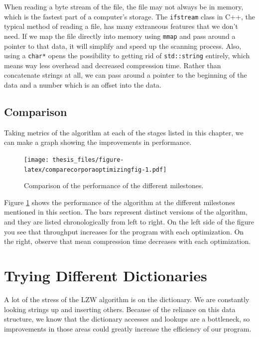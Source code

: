 \documentclass[12pt,twoside]{reedthesis}
\begin{document}
When reading a byte stream of the file, the file may not always be in memory, which is the fastest part of a computer's storage. The \texttt{ifstream} class in C++, the typical method of reading a file, has many extraneous features that we don't need. If we map the file directly into memory using \texttt{mmap} and pass around a pointer to that data, it will simplify and speed up the scanning process. Also, using a \texttt{char*} opens the possibility to getting rid of \texttt{std::string} entirely, which means way less overhead and decreased compression time. Rather than concatenate strings at all, we can pass around a pointer to the beginning of the data and a number which is an offset into the data.

\hypertarget{comparison}{%
\subsection{Comparison}\label{comparison}}

Taking metrics of the algorithm at each of the stages listed in this chapter, we can make a graph showing the improvements in performance.
\begin{figure}
\centering
\texttt{[image: thesis\_files/figure-latex/comparecorporaoptimizingfig-1.pdf]}
\caption{\label{fig:comparecorporaoptimizingfig}Comparison of the performance of the different milestones.}
\end{figure}
Figure \ref{fig:comparecorporaoptimizingfig} shows the performance of the algorithm at the different milestones mentioned in this section. The bars represent distinct versions of the algorithm, and they are listed chronologically from left to right. On the left side of the figure you see that throughput increases for the program with each optimization. On the right, observe that mean compression time decreases with each optimization.

\hypertarget{trying-different-dictionaries}{%
\section{Trying Different Dictionaries}\label{trying-different-dictionaries}}

A lot of the stress of the LZW algorithm is on the dictionary. We are constantly looking strings up and inserting others. Because of the reliance on this data structure, we know that the dictionary accesses and lookups are a bottleneck, so improvements in those areas could greatly increase the efficiency of our program.
\end{document}
